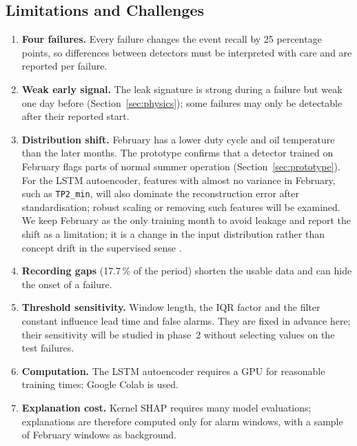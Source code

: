 \subsection{Limitations and Challenges}
\begin{enumerate}[itemsep=2pt]
  \item \textbf{Four failures.} Every failure changes the event recall by 25 percentage points, so differences between detectors must be interpreted with care and are reported per failure.
  \item \textbf{Weak early signal.} The leak signature is strong during a failure but weak one day before (Section~\ref{sec:physics}); some failures may only be detectable after their reported start.
  \item \textbf{Distribution shift.} February has a lower duty cycle and oil temperature than the later months. The prototype confirms that a detector trained on February flags parts of normal summer operation (Section~\ref{sec:prototype}). For the LSTM autoencoder, features with almost no variance in February, such as \texttt{TP2\_min}, will also dominate the reconstruction error after standardisation; robust scaling or removing such features will be examined. We keep February as the only training month to avoid leakage and report the shift as a limitation; it is a change in the input distribution rather than concept drift in the supervised sense \citep{gama2014drift}.
  \item \textbf{Recording gaps} (17.7\,\% of the period) shorten the usable data and can hide the onset of a failure.
  \item \textbf{Threshold sensitivity.} Window length, the IQR factor and the filter constant influence lead time and false alarms. They are fixed in advance here; their sensitivity will be studied in phase~2 without selecting values on the test failures.
  \item \textbf{Computation.} The LSTM autoencoder requires a GPU for reasonable training times; Google Colab is used.
  \item \textbf{Explanation cost.} Kernel SHAP requires many model evaluations; explanations are therefore computed only for alarm windows, with a sample of February windows as background.
\end{enumerate}

